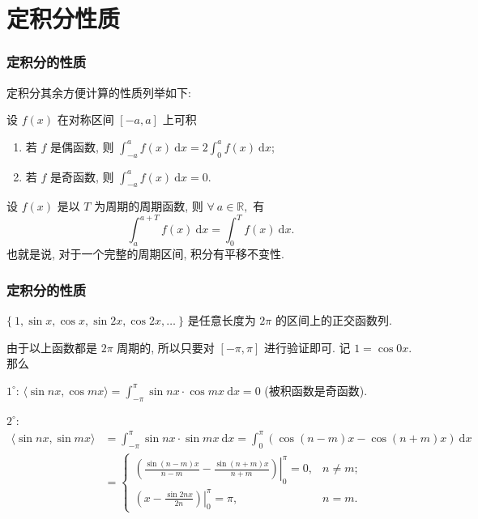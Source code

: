 
\section{定积分性质}


\begin{frame}
\frametitle{定积分的性质}

定积分其余方便计算的性质列举如下:

\begin{thm}
设 $f(x)$ 在对称区间 $[-a, a]$ 上可积
\begin{enumerate}
\item 若 $f$ 是偶函数, 则 $\int_{-a}^a f(x) ~ \mathrm{d}x = 2 \int_0^a f(x) ~ \mathrm{d}x$;
\item 若 $f$ 是奇函数, 则 $\int_{-a}^a f(x) ~ \mathrm{d}x = 0$.
\end{enumerate}
\end{thm}

\pause
\vspace{1em}

\begin{thm}
设 $f(x)$ 是以 $T$ 为周期的周期函数, 则 $\forall ~ a \in \mathbb{R},$ 有
\[ \int_a^{a+T} f(x) ~ \mathrm{d}x = \int_0^T f(x) ~ \mathrm{d}x. \]
也就是说, 对于一个完整的周期区间, 积分有平移不变性.
\end{thm}

\end{frame}


\begin{frame}
\frametitle{定积分的性质}

\begin{eg}
$\{ ~ 1, \sin x, \cos x, \sin 2x, \cos 2x, \dots ~ \}$ 是任意长度为 $2\pi$ 的区间上的正交函数列.
\end{eg}

\pause

\startproof[bg=yellow, fg=red]
由于以上函数都是 $2\pi$ 周期的, 所以只要对 $[-\pi, \pi]$ 进行验证即可. 记 $1 = \cos 0x.$ 那么

$1^\circ$: $\langle \sin nx, \cos mx \rangle = \int_{-\pi}^\pi \sin nx \cdot \cos mx ~ \mathrm{d}x = 0$ (被积函数是奇函数).

$2^\circ$:
\begin{align*}
\langle \sin nx, \sin mx \rangle & = \int_{-\pi}^\pi \sin nx \cdot \sin mx ~ \mathrm{d}x = \int_0^\pi (\cos (n-m)x - \cos (n+m)x) ~ \mathrm{d}x \\
& = \begin{cases} \left. \left(\frac{\sin (n-m)x}{n-m} - \frac{\sin (n+m)x}{n+m} \right) \right|_0^\pi = 0, & n \neq m; \\ \left. \left( x - \frac{\sin 2nx}{2n} \right) \right|_0^\pi = \pi, & n = m. \end{cases}
\end{align*}

\end{frame}

